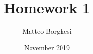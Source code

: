 \documentclass[11pt,twoside,a4paper]{report}
\begin{document}
\title{Homework 1}
\author{Matteo Borghesi}
\date{November 2019}
\maketitle
\end{document}
